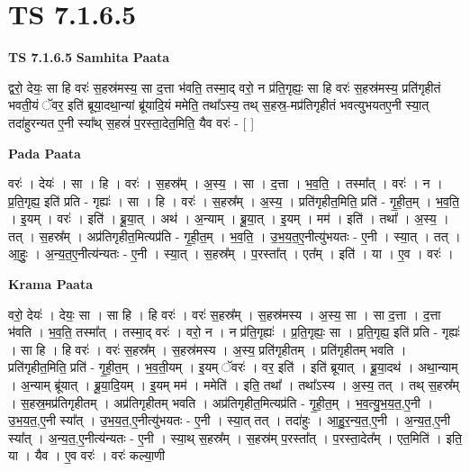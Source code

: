 \documentclass[17pt]{extarticle}
\begin{document}
\section{ TS 7.1.6.5 }

\textbf{TS 7.1.6.5 } \newline
\textbf{Samhita Paata} \newline

द्वरो॒ देयः॒ सा हि वरः॑ स॒हस्र॑मस्य॒ सा द॒त्ता भ॑वति॒ तस्मा॒द् वरो॒ न प्र॑ति॒गृह्यः॒ सा हि वरः॑ स॒हस्र॑मस्य॒ प्रति॑गृहीतं भवती॒यं ॅवर॒ इति॑ ब्रूया॒दथा॒न्यां ब्रू॑यादि॒यं ममेति॒ तथा᳚ऽस्य॒ तथ् स॒हस्र॒-मप्र॑तिगृहीतं भवत्युभयतए॒नी स्या॒त् तदा॑हुरन्यत ए॒नी स्या᳚थ् स॒हस्रं॑ प॒रस्ता॒देत॒मिति॒ यैव वरः॑ - [  ] \newline

\textbf{Pada Paata} \newline

वरः॑ । देयः॑ । सा । हि । वरः॑ । स॒हस्र᳚म् । अ॒स्य॒ । सा । द॒त्ता । भ॒व॒ति॒ । तस्मा᳚त् । वरः॑ । न । प्र॒ति॒गृह्य॒ इति॑ प्रति - गृह्यः॑ । सा । हि । वरः॑ । स॒हस्र᳚म् । अ॒स्य॒ । प्रति॑गृहीत॒मिति॒ प्रति॑ - गृ॒ही॒त॒म् । भ॒व॒ति॒ । इ॒यम् । वरः॑ । इति॑ । ब्रू॒या॒त् । अथ॑ । अ॒न्याम् । ब्रू॒या॒त् । इ॒यम् । मम॑ । इति॑ । तथा᳚ । अ॒स्य॒ । तत् । स॒हस्र᳚म् । अप्र॑तिगृहीत॒मित्यप्र॑ति - गृ॒ही॒त॒म् । भ॒व॒ति॒ । उ॒भ॒य॒त॒ए॒नीत्यु॑भयतः - ए॒नी । स्या॒त् । तत् । आ॒हुः॒ । अ॒न्य॒त॒ए॒नीत्य॑न्यतः - ए॒नी । स्या॒त् । स॒हस्र᳚म् । प॒रस्ता᳚त् । एत᳚म् । इति॑ । या । ए॒व । वरः॑ ।  \newline


\textbf{Krama Paata} \newline

वरो॒ देयः॑ । देयः॒ सा । सा हि । हि वरः॑ । वरः॑ स॒हस्र᳚म् । स॒हस्र॑मस्य । अ॒स्य॒ सा । सा द॒त्ता । द॒त्ता भ॑वति । भ॒व॒ति॒ तस्मा᳚त् । तस्मा॒द् वरः॑ । वरो॒ न । न प्र॑ति॒गृह्यः॑ । प्र॒ति॒गृह्यः॒ सा । प्र॒ति॒गृह्य॒ इति॑ प्रति - गृह्यः॑ । सा हि । हि वरः॑ । वरः॑ स॒हस्र᳚म् । स॒हस्र॑मस्य । अ॒स्य॒ प्रति॑गृहीतम् । प्रति॑गृहीतम् भवति । प्रति॑गृहीत॒मिति॒ प्रति॑ - गृ॒ही॒त॒म् । भ॒व॒ती॒यम् । इ॒यम् ॅवरः॑ । वर॒ इति॑ । इति॑ ब्रूयात् । ब्रू॒या॒दथ॑ । अथा॒न्याम् । अ॒न्याम् ब्रू॑यात् । ब्रू॒या॒दि॒यम् । इ॒यम् मम॑ । ममेति॑ । इति॒ तथा᳚ । तथा᳚ऽस्य । अ॒स्य॒ तत् । तथ् स॒हस्र᳚म् । स॒हस्र॒मप्र॑तिगृहीतम् । अप्र॑तिगृहीतम् भवति । अप्र॑तिगृहीत॒मित्यप्र॑ति - गृ॒ही॒त॒म् । भ॒व॒त्यु॒भ॒य॒त॒,ए॒नी । उ॒भ॒य॒त॒,ए॒नी स्या᳚त् । उ॒भ॒य॒त॒,ए॒नीत्यु॑भयतः - ए॒नी । स्या॒त् तत् । तदा॑हुः । आ॒हु॒र॒न्य॒त॒,ए॒नी । अ॒न्य॒त॒,ए॒नी स्या᳚त् । अ॒न्य॒त॒,ए॒नीत्य॑न्यतः - ए॒नी । स्या॒थ् स॒हस्र᳚म् । स॒हस्र॑म् प॒रस्ता᳚त् । प॒रस्ता॒देत᳚म् । एत॒मिति॑ । इति॒ या । यैव । ए॒व वरः॑ । वरः॑ कल्या॒णी \newline
\end{document}

